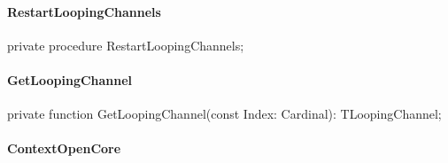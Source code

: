 \documentclass{report}
\newif\ifpdf
\begin{document}
\paragraph*{RestartLoopingChannels}\hspace*{\fill}

\label{ok_nested_1.TRepoSoundEngine-RestartLoopingChannels}
\begin{list}{}{
\setlength{\itemindent}{0cm}
\setlength{\listparindent}{0cm}
\setlength{\leftmargin}{\evensidemargin}
\addtolength{\leftmargin}{\tmplength}
\settowidth{\labelsep}{X}
\addtolength{\leftmargin}{\labelsep}
\setlength{\labelwidth}{\tmplength}
}
\item[\textbf{Declaration}\hfill]
\ifpdf
\begin{flushleft}
\fi
\begin{ttfamily}
private procedure RestartLoopingChannels;\end{ttfamily}

\ifpdf
\end{flushleft}
\fi

\end{list}
\paragraph*{GetLoopingChannel}\hspace*{\fill}

\label{ok_nested_1.TRepoSoundEngine-GetLoopingChannel}
\begin{list}{}{
\setlength{\itemindent}{0cm}
\setlength{\listparindent}{0cm}
\setlength{\leftmargin}{\evensidemargin}
\addtolength{\leftmargin}{\tmplength}
\settowidth{\labelsep}{X}
\addtolength{\leftmargin}{\labelsep}
\setlength{\labelwidth}{\tmplength}
}
\item[\textbf{Declaration}\hfill]
\ifpdf
\begin{flushleft}
\fi
\begin{ttfamily}
private function GetLoopingChannel(const Index: Cardinal): TLoopingChannel;\end{ttfamily}

\ifpdf
\end{flushleft}
\fi

\end{list}
\paragraph*{ContextOpenCore}\hspace*{\fill}
\end{document}
